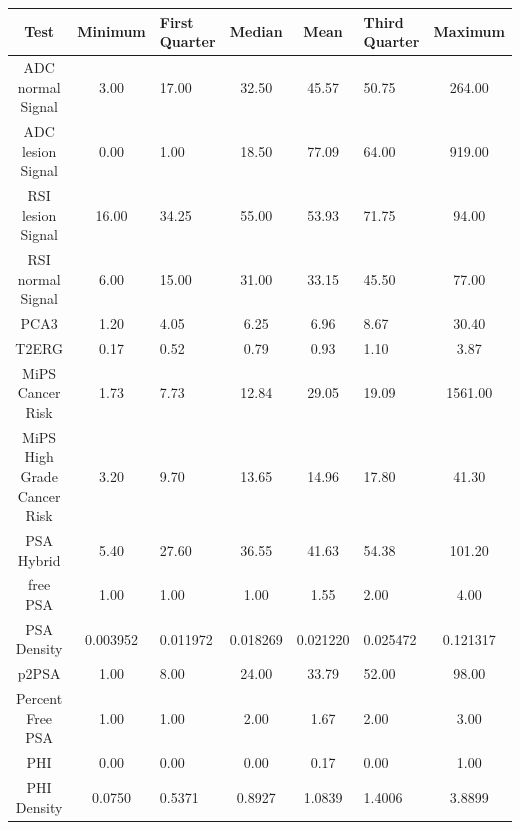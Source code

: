 \documentclass[]{article}
\begin{document}
\begin{longtable}{|c|c|p{1.5cm}|c|c|p{1.5cm}|c|} 
\hline
{\bf Test} &  {\bf Minimum}  & {\bf First Quarter} &  {\bf Median}  & {\bf Mean}  & {\bf Third Quarter}  & {\bf Maximum}   \\
\hline
      ADC normal Signal &     3.00       &  17.00       &    32.50  &  45.57  &          50.75  &     264.00  \\
\hline
      ADC lesion Signal &     0.00       &   1.00       &    18.50  &  77.09  &          64.00  &     919.00  \\
\hline
      RSI lesion Signal &    16.00       &  34.25       &    55.00  &  53.93  &          71.75  &      94.00  \\
\hline
      RSI normal Signal &     6.00       &  15.00       &    31.00  &  33.15  &          45.50  &      77.00  \\
\hline
                   PCA3 &     1.20       &   4.05       &     6.25  &   6.96  &           8.67  &      30.40  \\
\hline
                  T2ERG &     0.17       &   0.52       &     0.79  &   0.93  &           1.10  &       3.87  \\
\hline
       MiPS Cancer Risk &     1.73       &   7.73       &    12.84  &  29.05  &          19.09  &    1561.00  \\
\hline
  MiPS High Grade Cancer Risk &     3.20       &   9.70       &    13.65  &  14.96  &          17.80  &      41.30  \\
\hline
       PSA Hybrid &     5.40       &  27.60       &    36.55  &  41.63  &          54.38  &     101.20  \\
\hline
         free PSA &     1.00       &   1.00       &     1.00  &   1.55  &           2.00  &       4.00  \\
\hline
         PSA Density  & 0.003952   &  0.011972    &     0.018269  & 0.021220 & 0.025472 & 0.121317 \\
\hline
            p2PSA &     1.00       &   8.00       &    24.00  &  33.79  &          52.00  &      98.00  \\
\hline
 Percent Free PSA &     1.00       &   1.00       &     2.00  &   1.67  &           2.00  &       3.00  \\
\hline      
              PHI &     0.00       &   0.00       &     0.00  &   0.17  &           0.00  &       1.00  \\
\hline      
          PHI Density &  0.0750 &  0.5371 & 0.8927 & 1.0839 & 1.4006 & 3.8899 \\

\end{longtable}
\end{document}
